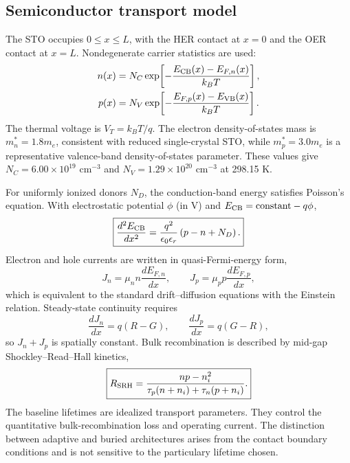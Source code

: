\documentclass[11pt]{article}
\begin{document}
\subsection{Semiconductor transport model}

The STO occupies $0\leq x\leq L$, with the HER contact at $x=0$ and the OER contact at $x=L$. Nondegenerate carrier statistics are used:
\begin{align}
n(x)&=N_C\exp\!\left[-\frac{E_{\rm CB}(x)-E_{F,n}(x)}{k_BT}\right],\\
p(x)&=N_V\exp\!\left[-\frac{E_{F,p}(x)-E_{\rm VB}(x)}{k_BT}\right].
\end{align}
The thermal voltage is $V_T=k_BT/q$. The electron density-of-states mass is $m_n^*=1.8m_e$, consistent with reduced single-crystal STO,\cite{ahrens2007} while $m_p^*=3.0m_e$ is a representative valence-band density-of-states parameter. These values give $N_C=6.00\times10^{19}$ cm$^{-3}$ and $N_V=1.29\times10^{20}$ cm$^{-3}$ at 298.15 K.

For uniformly ionized donors $N_D$, the conduction-band energy satisfies Poisson's equation. With electrostatic potential $\phi$ (in V) and $E_{\rm CB}=\mathrm{constant}-q\phi$,
\begin{equation}
\boxed{\frac{d^2E_{\rm CB}}{dx^2}=\frac{q^2}{\epsilon_0\epsilon_r}\left(p-n+N_D\right).}
\label{eq:poisson}
\end{equation}
Electron and hole currents are written in quasi-Fermi-energy form,
\begin{equation}
\boxed{J_n=\mu_n n\frac{dE_{F,n}}{dx},}\qquad
\boxed{J_p=\mu_p p\frac{dE_{F,p}}{dx},}
\label{eq:dd}
\end{equation}
which is equivalent to the standard drift--diffusion equations with the Einstein relation. Steady-state continuity requires
\begin{equation}
\boxed{\frac{dJ_n}{dx}=q(R-G),}\qquad
\boxed{\frac{dJ_p}{dx}=q(G-R),}
\label{eq:continuity}
\end{equation}
so $J_n+J_p$ is spatially constant. Bulk recombination is described by mid-gap Shockley--Read--Hall kinetics,\cite{shockleyread1952,hall1952}
\begin{equation}
\boxed{R_{\rm SRH}=\frac{np-n_i^2}{\tau_p(n+n_i)+\tau_n(p+n_i)}.}
\label{eq:srh}
\end{equation}
The baseline lifetimes are idealized transport parameters. They control the quantitative bulk-recombination loss and operating current. The distinction between adaptive and buried architectures arises from the contact boundary conditions and is not sensitive to the particulary lifetime chosen.
\end{document}
